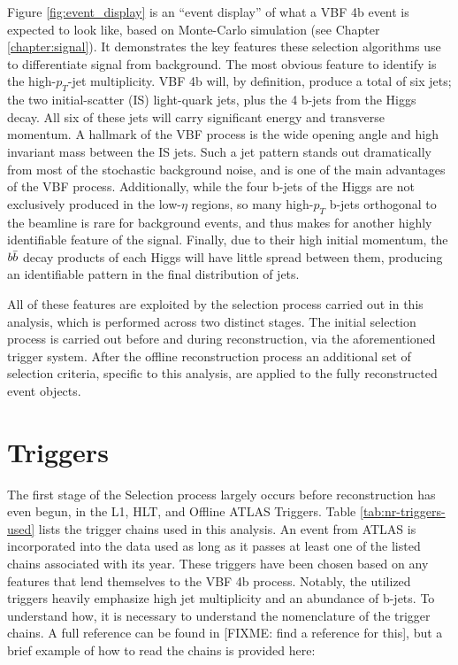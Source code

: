     Figure \ref{fig:event_display} is an ``event display'' of what a VBF \to 4b event is expected to look like,
        based on Monte-Carlo simulation (see Chapter \ref{chapter:signal}).
    It demonstrates the key features these selection algorithms use to differentiate signal from background.
    The most obvious feature to identify is the high-$p_T$-jet multiplicity.
    VBF \to 4b will, by definition, produce a total of six jets;
        the two initial-scatter (IS) light-quark jets, plus the 4 b-jets from the Higgs decay.
    All six of these jets will carry significant energy and transverse momentum.
    A hallmark of the VBF process is the wide opening angle and high invariant mass between the IS jets.
    Such a jet pattern stands out dramatically from most of the stochastic background noise,
        and is one of the main advantages of the VBF process.
    Additionally, while the four b-jets of the Higgs are not exclusively produced in the low-$\eta$ regions,
        so many high-$p_T$ b-jets orthogonal to the beamline is rare for background events,
        and thus makes for another highly identifiable feature of the signal.
    Finally, due to their high initial momentum,
        the $b \bar{b}$ decay products of each Higgs will have little spread between them,
        producing an identifiable pattern in the final distribution of jets.

    All of these features are exploited by the selection process carried out in this analysis,
        which is performed across two distinct stages.
    The initial selection process is carried out before and during reconstruction, via the aforementioned trigger system.
    After the offline reconstruction process an additional set of selection criteria,
        specific to this analysis, are applied to the fully reconstructed event objects.
    
    \FloatBarrier
    \section{Triggers}
        
        The first stage of the Selection process largely occurs before reconstruction has even begun,
            in the L1, HLT, and Offline ATLAS Triggers.
        Table \ref{tab:nr-triggers-used} lists the trigger chains used in this analysis.
        An event from ATLAS is incorporated into the data used as long as it passes at least one 
            of the listed chains associated with its year.
        These triggers have been chosen based on any features that lend themselves to the VBF \to 4b process.
        Notably, the utilized triggers heavily emphasize high jet multiplicity and an abundance of b-jets.
        To understand how, it is necessary to understand the nomenclature of the trigger chains.
        A full reference can be found in [FIXME: find a reference for this],
            but a brief example of how to read the chains is provided here:

